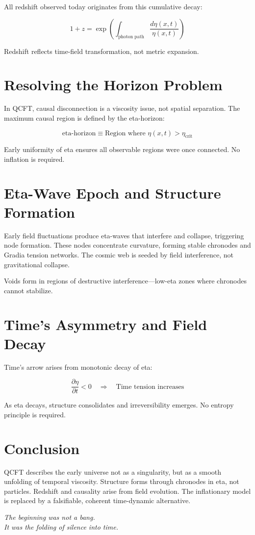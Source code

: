 \documentclass[12pt]{article}
\begin{document}
All redshift observed today originates from this cumulative decay:

\[
1 + z = \exp\left( \int_{\text{photon path}} \frac{d\eta(x,t)}{\eta(x,t)} \right)
\]

Redshift reflects time-field transformation, not metric expansion.

\section{Resolving the Horizon Problem}

In QCFT, causal disconnection is a viscosity issue, not spatial separation. The maximum causal region is defined by the eta-horizon:

\[
\text{eta-horizon} \equiv \text{Region where } \eta(x,t) > \eta_{\text{crit}}
\]

Early uniformity of eta ensures all observable regions were once connected. No inflation is required.

\section{Eta-Wave Epoch and Structure Formation}

Early field fluctuations produce eta-waves that interfere and collapse, triggering node formation. These nodes concentrate curvature, forming stable chronodes and Gradia tension networks. The cosmic web is seeded by field interference, not gravitational collapse.

Voids form in regions of destructive interference—low-eta zones where chronodes cannot stabilize.

\section{Time's Asymmetry and Field Decay}

Time’s arrow arises from monotonic decay of eta:

\[
\frac{\partial \eta}{\partial t} < 0 \quad \Rightarrow \quad \text{Time tension increases}
\]

As eta decays, structure consolidates and irreversibility emerges. No entropy principle is required.

\section*{Conclusion}

QCFT describes the early universe not as a singularity, but as a smooth unfolding of temporal viscosity. Structure forms through chronodes in eta, not particles. Redshift and causality arise from field evolution. The inflationary model is replaced by a falsifiable, coherent time-dynamic alternative.

\begin{center}
\textit{The beginning was not a bang.\\It was the folding of silence into time.}
\end{center}
\end{document}
